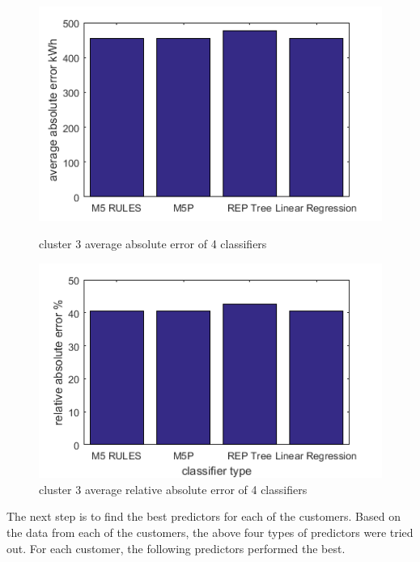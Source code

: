 \begin{figure}
\centering
\begin{minipage}{.5\textwidth}
  \centering
  \includegraphics[width=\linewidth]{cluster-3-diff-classifier-avg-abs.png}
  \caption{cluster 3 average absolute error of 4 classifiers}
  \label{fig:cluster-3-predictors}
\end{minipage}%
\begin{minipage}{.5\textwidth}
  \centering
  \includegraphics[width=\linewidth]{cluster-3-diff-classifier-relative-abs.png}
  \caption{cluster 3 average relative absolute error of 4 classifiers}
\end{minipage}

\end{figure}

The next step is to find the best predictors for each of the customers. Based on the data from each of the customers, the above four types of predictors were tried out. For each customer, the following predictors performed the best. 

